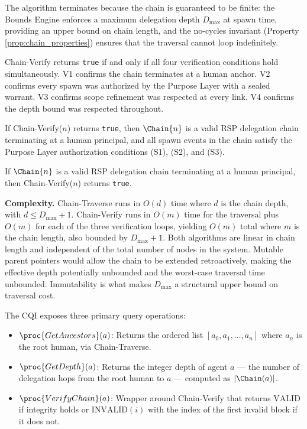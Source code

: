 The algorithm terminates because the chain is guaranteed to be finite: the Bounds Engine enforces a maximum delegation depth $D_{\max}$ at spawn time, providing an upper bound on chain length, and the no-cycles invariant (Property \ref{prop:chain_properties}) ensures that the traversal cannot loop indefinitely.

Chain-Verify returns \texttt{true} if and only if all four verification conditions hold simultaneously. V1 confirms the chain terminates at a human anchor. V2 confirms every spawn was authorized by the Purpose Layer with a sealed warrant. V3 confirms scope refinement was respected at every link. V4 confirms the depth bound was respected throughout.

\begin{prop}
\label{prop:chain_verify_soundness}
If Chain-Verify($n$) returns \texttt{true}, then $\Chain{n}$ is a valid RSP delegation chain terminating at a human principal, and all spawn events in the chain satisfy the Purpose Layer authorization conditions (S1), (S2), and (S3).
\end{prop}

\begin{prop}
\label{prop:chain_verify_completeness}
If $\Chain{n}$ is a valid RSP delegation chain terminating at a human principal, then Chain-Verify($n$) returns \texttt{true}.
\end{prop}

\textbf{Complexity.} Chain-Traverse runs in $O(d)$ time where $d$ is the chain depth, with $d \leq D_{\max} + 1$. Chain-Verify runs in $O(m)$ time for the traversal plus $O(m)$ for each of the three verification loops, yielding $O(m)$ total where $m$ is the chain length, also bounded by $D_{\max} + 1$. Both algorithms are linear in chain length and independent of the total number of nodes in the system. Mutable parent pointers would allow the chain to be extended retroactively, making the effective depth potentially unbounded and the worst-case traversal time unbounded. Immutability is what makes $D_{\max}$ a structural upper bound on traversal cost.

The CQI exposes three primary query operations:

\begin{itemize}
    \item $\proc{GetAncestors}(a)$: Returns the ordered list $[a_0, a_1, \ldots, a_n]$ where $a_n$ is the root human, via Chain-Traverse.

    \item $\proc{GetDepth}(a)$: Returns the integer depth of agent $a$ — the number of delegation hops from the root human to $a$ — computed as $|\Chain(a)|$.

    \item $\proc{VerifyChain}(a)$: Wrapper around Chain-Verify that returns $\mathrm{VALID}$ if integrity holds or $\mathrm{INVALID}(i)$ with the index of the first invalid block if it does not.
\end{itemize}

